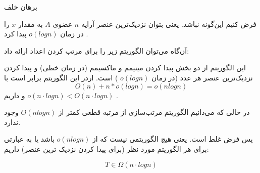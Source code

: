 \proof
برهان خلف

فرض کنیم این‌گونه نباشد. یعنی بتوان نزدیک‌ترین عنصر آرایه 
$n$
عضوی 
$A$
به مقدار 
$x$
را در زمان 
$o(logn)$
پیدا کرد
.

آن‌گاه می‌توان الگوریتم زیر را برای مرتب کردن اعداد ارائه داد:

این الگوریتم از دو بخش پیدا کردن مینیمم و ماکسیمم (در زمان خطی) و پیدا کردن نزدیک‌ترین عنصر هر عدد (در زمان 
$o(logn)$
)
است.
اردر این الگوریتم
برابر است با
\begin{equation*}
	O(n) + n * o(logn) = o(nlogn)
\end{equation*}
و داریم 
$o(n\cdot log n) < O(n\cdot log n)$
.

در حالی که می‌دانیم الگوریتم‌ مرتب‌‌سازی از مرتبه قطعی کمتر از $O(nlogn)$ وجود ندارد.

پس فرض غلط است.
یعنی هیچ الگوریتمی نیست که از 
$o(nlogn)$
باشد یا به عبارتی برای هر الگوریتم مورد نظر (برای پیدا کردن نزدیک ترین عنصر) 
داریم:

\begin{equation*}
T \in \Omega(n\cdot logn)
\end{equation*}

\newpage